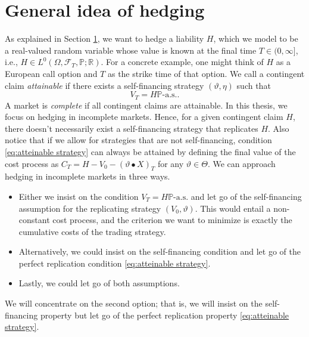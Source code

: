 \documentclass[11pt,a4paper,twoside,openany]{report}
\numberwithin{equation}{section}
\theoremstyle{plain} %
\theoremstyle{definition} %
\theoremstyle{remark} %
\begin{document}
\section{General idea of hedging}\label{sec:general idea of hedging}
As explained in Section \ref{sec:general idea of hedging}, we want to hedge a liability \(H\), which we model to be a real-valued random variable whose value is known at the final time \(T\in (0,\infty]\), i.e., \(H\in L^0(\Omega,\mathcal{F}_T,\mathbb{P};\mathbb{R})\). For a concrete example, one might think of \(H\) as a European call option and \(T\) as the strike time of that option.
We call a contingent claim \textit{attainable} if there exists a self-financing strategy \((\vartheta,\eta)\) such that
\begin{equation}\label{eq:atteinable strategy}
    V_T = H \mathbb{P}\text{-a.s.}.
\end{equation}
A market is \textit{complete} if all contingent claims are attainable. In this thesis, we focus on hedging in incomplete markets. Hence, for a given contingent claim \(H\), there doesn't necessarily exist a self-financing strategy that replicates \(H\). Also notice that if we allow for strategies that are not self-financing, condition \eqref{eq:atteinable strategy} can always be attained by defining the final value of the cost process as \(C_T=H-V_0-(\vartheta\bullet X)_T\) for any \(\vartheta\in\Theta\). We can approach hedging in incomplete markets in three ways.
\begin{itemize}
    \item Either we insist on the condition \(V_T = H\mathbb{P}\text{-a.s.}\) and let go of the self-financing assumption for the replicating strategy \((V_0,\vartheta)\). This would entail a non-constant cost process, and the criterion we want to minimize is exactly the cumulative costs of the trading strategy.
    \item Alternatively, we could insist on the self-financing condition and let go of the perfect replication condition \eqref{eq:atteinable strategy}.
    \item Lastly, we could let go of both assumptions.
\end{itemize}
We will concentrate on the second option; that is, we will insist on the self-financing property but let go of the perfect replication property \eqref{eq:atteinable strategy}. 
\end{document}
